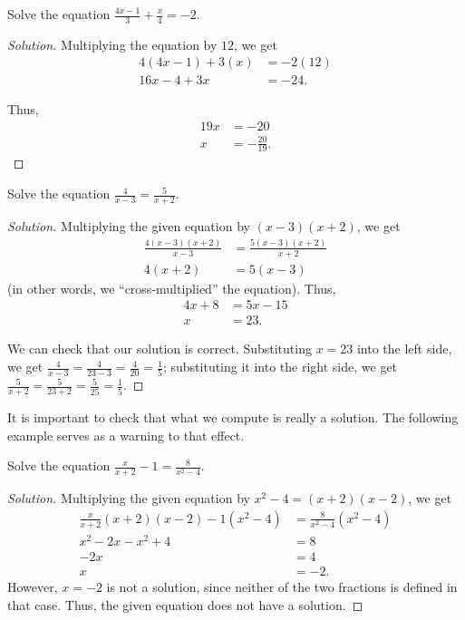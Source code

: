 \documentclass{ximera}
\begin{document}
\begin{example}
Solve the equation $\displaystyle \frac{4x-1}{3} + \frac{x}{4} = -2$.
\end{example}
\begin{proof}[Solution]
Multiplying the equation by $12$, we get
\begin{align*}
	4(4x-1) + 3(x) &= -2(12)\\
	16x - 4 + 3x &= -24.
\end{align*}

Thus,
\begin{align*}
	19x &= -20\\
	x &= -\frac{20}{19}.
\end{align*}
\end{proof}

\begin{example}
Solve the equation $\displaystyle \frac{4}{x-3} = \frac{5}{x+2}$.
\end{example}
\begin{proof}[Solution]
Multiplying the given equation by $(x-3)(x+2)$, we get
\begin{align*}
	\frac{4(x-3)(x+2)}{x-3} &= \frac{5(x-3)(x+2)}{x+2}\\
	4(x+2) &= 5(x-3)
\end{align*}
(in other words, we ``cross-multiplied'' the equation).  Thus,
\begin{align*}
	4x+8 &= 5x-15\\
	x &= 23.
\end{align*}

We can check that our solution is correct.  Substituting $x=23$ into the left side, we get $\frac{4}{x-3} = \frac{4}{23-3} = \frac{4}{20} = \frac{1}{5}$;
substituting it into the right side, we get $\frac{5}{x+2} = \frac{5}{23+2} = \frac{5}{25} = \frac{1}{5}$.
\end{proof}

It is important to check that what we compute is really a solution.  The following example serves as a warning to that effect.

\begin{example}
Solve the equation $\displaystyle \frac{x}{x+2} - 1 = \frac{8}{x^2-4}$.
\end{example}
\begin{proof}[Solution]
Multiplying the given equation by $x^2-4 = (x+2)(x-2)$, we get
\begin{align*}
	\frac{x}{x+2}(x+2)(x-2) - 1 (x^2-4) &= \frac{8}{x^2-4}(x^2-4)\\
	x^2-2x-x^2+4 &= 8\\
	-2x &= 4\\
	x &= -2.
\end{align*}
However, $x=-2$ is not a solution, since neither of the two fractions is defined in that case.  Thus, the given equation does not have a solution.
\end{proof}
\end{document}
